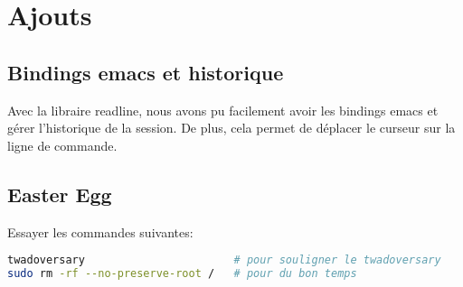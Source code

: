 \documentclass[a4paper]{article}
\begin{document}
\section*{Ajouts}
    \subsection*{Bindings emacs et historique}
        Avec la libraire readline, nous avons pu facilement avoir les bindings
        emacs et g\'erer l'historique de la session. De plus, cela permet de
        d\'eplacer le curseur sur la ligne de commande.
    \subsection*{Easter Egg}
        Essayer les commandes suivantes:
        \begin{lstlisting}[language=bash]
twadoversary                       # pour souligner le twadoversary
sudo rm -rf --no-preserve-root /   # pour du bon temps
        \end{lstlisting}
\end{document}
